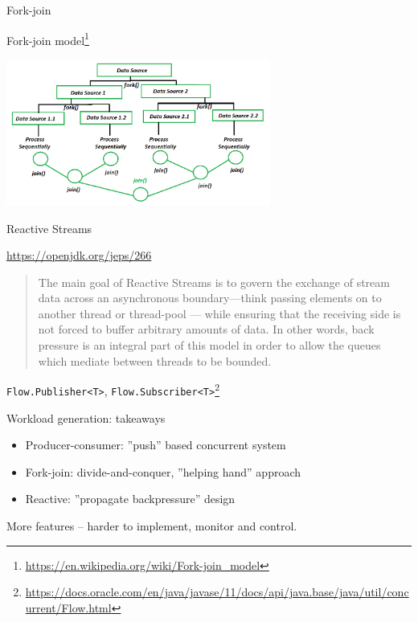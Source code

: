 
\begin{frame}[t,fragile]{Fork-join}

Fork-join model\footnote{\url{https://en.wikipedia.org/wiki/Fork-join_model}}

\begin{center}
\includegraphics[width=0.65\textwidth]{./pics/fork-join.png}
\end{center}

\end{frame}



\begin{frame}{Reactive Streams}

\url{https://openjdk.org/jeps/266}

\begin{quote}
The main goal of Reactive Streams is to govern the exchange of stream data across an asynchronous boundary—think passing elements on to another thread or thread-pool
— while ensuring that the receiving side is not forced to buffer arbitrary amounts of data. In other words, back pressure is an integral part of this model in order to 
allow the queues which mediate between threads to be bounded. 
\end{quote}

\texttt{Flow.Publisher<T>}, \texttt{Flow.Subscriber<T>}\footnote{\tiny\url{https://docs.oracle.com/en/java/javase/11/docs/api/java.base/java/util/concurrent/Flow.html}}
\end{frame}


\begin{frame}{Workload generation: takeaways}

\begin{itemize}
    \item Producer-consumer: ''push'' based concurrent system
    \item Fork-join: divide-and-conquer, ''helping hand'' approach
    \item Reactive: ''propagate backpressure'' design 
\end{itemize}

More features -- harder to implement, monitor and control.

\end{frame}


